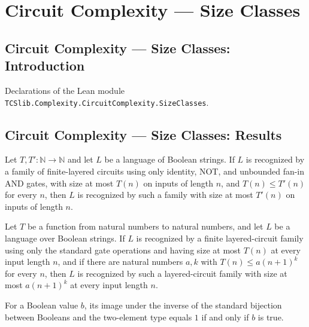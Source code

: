\section{Circuit Complexity --- Size Classes}
\subsection*{Circuit Complexity --- Size Classes: Introduction}

Declarations of the Lean module \texttt{TCSlib.Complexity.CircuitComplexity.SizeClasses}.

\subsection*{Circuit Complexity --- Size Classes: Results}

\begin{theorem}
\label{Language.InLayeredSIZE.mono}
\leanok
{}
Let $T,T' : \mathbb{N} \to \mathbb{N}$ and let $L$ be a language of Boolean strings. If
$L$ is recognized by a family of finite-layered circuits using only identity, NOT, and
unbounded fan-in AND gates, with size at most $T(n)$ on inputs of length $n$, and $T(n)
\le T'(n)$ for every $n$, then $L$ is recognized by such a family with size at most
$T'(n)$ on inputs of length $n$.
\end{theorem}

\begin{theorem}
\label{Language.InLayeredSIZE.inLayeredPPoly}
\leanok
{}
Let $T$ be a function from natural numbers to natural numbers, and let $L$ be a language
over Boolean strings. If $L$ is recognized by a finite layered-circuit family using only
the standard gate operations and having size at most $T(n)$ at every input length $n$,
and if there are natural numbers $a,k$ with $T(n)\leq a(n+1)^k$ for every $n$, then $L$
is recognized by such a layered-circuit family with size at most $a(n+1)^k$ at every
input length $n$.
\end{theorem}

\begin{theorem}
\label{finTwoEquiv_symm_eq_one_iff}
\leanok
{}
For a Boolean value $b$, its image under the inverse of the standard bijection between
Booleans and the two-element type equals $1$ if and only if $b$ is true.
\end{theorem}

